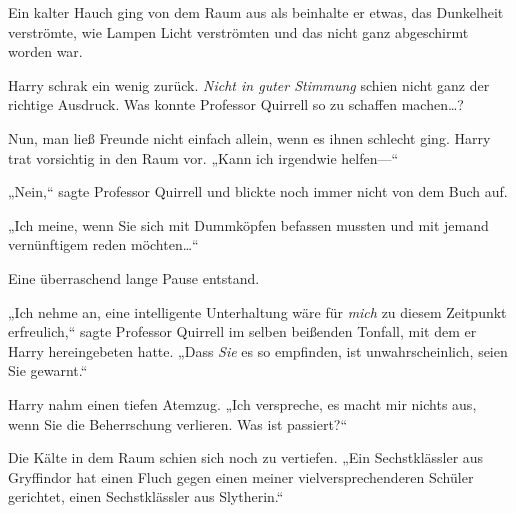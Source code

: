 Ein kalter Hauch ging von dem Raum aus als beinhalte er etwas, das Dunkelheit verströmte, wie Lampen Licht verströmten und das nicht ganz abgeschirmt worden war.

Harry schrak ein wenig zurück. \emph{Nicht in guter Stimmung} schien nicht ganz der richtige Ausdruck. Was konnte Professor Quirrell so zu schaffen machen…?

Nun, man ließ Freunde nicht einfach allein, wenn es ihnen schlecht ging. Harry trat vorsichtig in den Raum vor. „Kann ich irgendwie helfen—“

„Nein,“ sagte Professor Quirrell und blickte noch immer nicht von dem Buch auf.


„Ich meine, wenn Sie sich mit Dummköpfen befassen mussten und mit jemand vernünftigem reden möchten…“

Eine überraschend lange Pause entstand.

„Ich nehme an, eine intelligente Unterhaltung wäre für \emph{mich} zu diesem Zeitpunkt erfreulich,“ sagte Professor Quirrell im selben beißenden Tonfall, mit dem er Harry hereingebeten hatte. „Dass \emph{Sie} es so empfinden, ist unwahrscheinlich, seien Sie gewarnt.“

Harry nahm einen tiefen Atemzug. „Ich verspreche, es macht mir nichts aus, wenn Sie die Beherrschung verlieren. Was ist passiert?“

Die Kälte in dem Raum schien sich noch zu vertiefen. „Ein Sechstklässler aus Gryffindor hat einen Fluch gegen einen meiner vielversprechenderen Schüler gerichtet, einen Sechstklässler aus Slytherin.“


